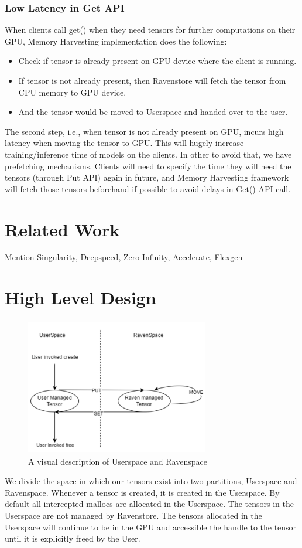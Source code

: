 \documentclass{article}
\begin{document}
	\subsubsection{Low Latency in Get API} When clients call get() when they need tensors for further computations on their GPU, Memory Harvesting implementation does the following:
	\begin{itemize}
		\item Check if tensor is already present on GPU device where the client is running.
		\item If tensor is not already present, then Ravenstore will fetch the tensor from CPU memory to GPU device.
		\item And the tensor would be moved to Userspace and handed over to the user.
	\end{itemize}
	The second step, i.e., when tensor is not already present on GPU, incurs high latency when moving the tensor to GPU.
	This will hugely increase training/inference time of models on the clients. In other to avoid that, we have prefetching mechanisms.
	Clients will need to specify the time they will need the tensors (through Put API) again in future, and Memory Harvesting framework will
	fetch those tensors beforehand if possible to avoid delays in Get() API call.

\section{Related Work}
\cite{shuklasingularity}

Mention Singularity, Deepspeed, Zero Infinity, Accelerate, Flexgen

\section{High Level Design}
\begin{figure}[!htbp]
	\centering
	\includegraphics[height=6cm, width=8cm]{figures/ravenspace.png}
	\caption{A visual description of Userspace and Ravenspace}
\end{figure}
We divide the space in which our tensors exist into two partitions, Userspace and Ravenspace.
Whenever a tensor is created, it is created in the Userspace. By default all intercepted mallocs 
are allocated in the Userspace. The tensors in the Userspace are not managed by Ravenstore. 
The tensors allocated in the Userspace will continue to be in the GPU and accessible the handle to 
the tensor until it is explicitly freed by the User.
\end{document}
